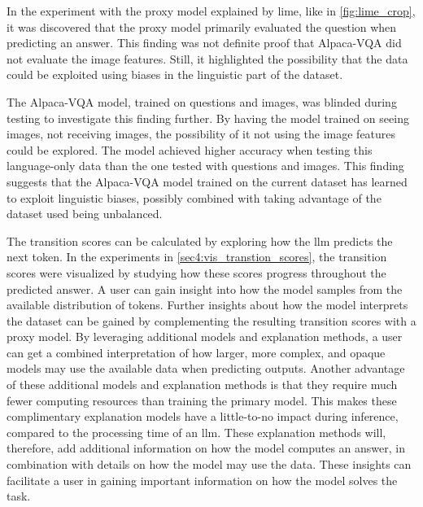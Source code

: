 In the experiment with the proxy model explained by \gls{lime}, like in \autoref{fig:lime_crop}, it was discovered that the proxy model primarily evaluated the question when predicting an answer. 
This finding was not definite proof that Alpaca-VQA did not evaluate the image features. Still, it highlighted the possibility that the data could be exploited using biases in the linguistic part of the dataset. 

The Alpaca-VQA model, trained on questions and images, was blinded during testing to investigate this finding further. By having the model trained on seeing images, not receiving images, the possibility of it not using the image features could be explored. The model achieved higher accuracy when testing this language-only data than the one tested with questions and images.
This finding suggests that the Alpaca-VQA model trained on the current dataset has learned to exploit linguistic biases, possibly combined with taking advantage of the dataset used being unbalanced. 


The transition scores can be calculated by exploring how the \gls{llm} predicts the next token. In the experiments in \autoref{sec4:vis_transtion_scores}, the transition scores were visualized by studying how these scores progress throughout the predicted answer. A user can gain insight into how the model samples from the available distribution of tokens. Further insights about how the model interprets the dataset can be gained by complementing the resulting transition scores with a proxy model. %
By leveraging additional models and explanation methods, a user can get a combined interpretation of how larger, more complex, and opaque models may use the available data when predicting outputs.
Another advantage of these additional models and explanation methods is that they require much fewer computing resources than training the primary model. 
This makes these complimentary explanation models have a little-to-no impact during inference, compared to the processing time of an \gls{llm}. 
These explanation methods will, therefore, add additional information on how the model computes an answer, in combination with details on how the model may use the data. These insights can facilitate a user in gaining important information on how the model solves the task.

